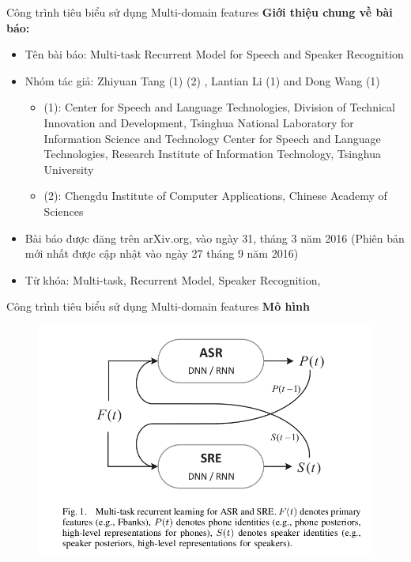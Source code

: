 \documentclass[notheorems, aspectratio=54]{beamer}
\begin{document}
\begin{frame}{Công trình tiêu biểu sử dụng Multi-domain features}
	\textbf{Giới thiệu chung về bài báo:}
	\begin{itemize}
		\item Tên bài báo: Multi-task Recurrent Model for Speech and Speaker Recognition
		\item Nhóm tác giả: Zhiyuan Tang (1) (2) , Lantian Li (1) and Dong Wang (1)
		\begin{itemize}
			\item (1): Center for Speech and Language Technologies, Division of Technical Innovation and Development,
			Tsinghua National Laboratory for Information Science and Technology
			Center for Speech and Language Technologies, Research Institute of Information Technology, Tsinghua University
			\item (2): Chengdu Institute of Computer Applications, Chinese Academy of Sciences
		\end{itemize}
		\item Bài báo được đăng trên arXiv.org, vào ngày 31, tháng 3 năm 2016 (Phiên bản mới nhất được cập nhật vào ngày 27 tháng 9 năm 2016)
		\item Từ khóa: Multi-task, Recurrent Model, Speaker Recognition, 
	\end{itemize}
\end{frame}
\begin{frame}{Công trình tiêu biểu sử dụng Multi-domain features}
	\textbf{Mô hình}
	\begin{figure}[H]
		\centering
		\includegraphics[width=0.75\linewidth]{images/multi-task-recurrent-learning.png}
		\label{fig:writing-thesis}
	\end{figure}
\end{frame}
\end{document}
